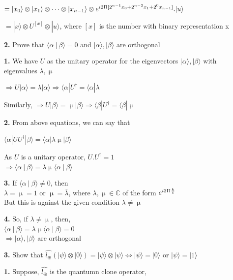 \documentclass [12pt]{article}
\theoremstyle{definition}
\newcommand{\ket}[1]{| {#1} \rangle}
\newcommand{\bra}[1]{\langle {#1} |}
\newcommand{\braket}[2]{\langle #1 \ | \ #2 \rangle}
\begin{document}
\phantom{1000em} $ = \ket{x_{0}} \otimes \ket{x_{1}} \otimes \dots \otimes \ket{x_{n-1}} \otimes e^{i2\Uppi[2^{n-1}x_{0}+2^{n-2}x_{1}+2^{0}x_{n-1}]} . \ket{u}$

\phantom{1000em} $ =\ket{x} \otimes U^{[x]} \otimes \ket{u}$, where $[x]$ is the number with binary representation x

\newpage

{\bf 2.} Prove that $\braket{\alpha}{\beta} = 0$ and $\ket{\alpha}, \ket{\beta}$ are orthogonal

\phantom{1em} {\bf 1.} We have $U$ as the unitary operator for the eigenvectors $\ket{\alpha}, \ket{\beta}$ with eigenvalues $\lambda, \upmu$

\phantom{1000em} $\Rightarrow U\ket{\alpha} = \lambda\ket{\alpha} \Rightarrow \bra{\alpha}U^{\dagger} = \bra{\alpha}\lambda$

\phantom{1000em} Similarly, $\Rightarrow U\ket{\beta} = \upmu\ket{\beta} \Rightarrow \bra{\beta}U^{\dagger} = \bra{\beta}\upmu$

\phantom{1em} {\bf 2.} From above equations, we can say that

\phantom{1000em} $\bra{\alpha} U U^{\dagger} \ket{\beta} = \bra{\alpha} \lambda \upmu \ket{\beta}$
 
\phantom{1000em} As $U$ is a unitary operator, $U.U^{\dagger} = 1$\\
\phantom{1000em} $\Rightarrow \braket{\alpha}{\beta} = \lambda\upmu \braket{\alpha}{\beta}$

\phantom{1em} {\bf 3.} If $\braket{\alpha}{\beta} \neq 0$, then \\
\phantom{1000em} $\lambda = \upmu = 1$  or $\upmu = \bar{\lambda}$, where $\lambda, \upmu \in \mathds{C}$ of the form $e^{i2\Uppi \frac{k}{t}}$\\
\phantom{1000em} But this is against the given condition $\lambda \neq \upmu$

\phantom{1em} {\bf 4.} So, if $\lambda \neq \upmu$, then,\\
\phantom{1000em} $\braket{\alpha}{\beta} = \lambda\upmu \braket{\alpha}{\beta} = 0$ \\
\phantom{1000em}$\Rightarrow \ket{\alpha}, \ket{\beta}$ are orthogonal

{\bf 3.} Show that $\hat{l_{\oplus}}(\ket{\psi} \otimes \ket{0}) = \ket{\psi} \otimes \ket{\psi} \Leftrightarrow \ket{\psi} = \ket{0}$ or $\ket{\psi} = \ket{1}$ 

\phantom{1em} {\bf 1.} Suppose, $\hat{l_{\oplus}}$ is the quantumn clone operator,
\end{document}
